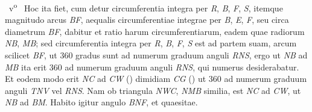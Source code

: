 %
~v\textsuperscript{o}\rbrack\ %
%
%
Hoc ita fiet,
cum detur circumferentia integra
per \textit{R}, \textit{B}, \textit{F}, \textit{S},
itemque magnitudo arcus \textit{BF},
aequalis circumferentiae integrae per \textit{B}, \textit{E}, \textit{F},
seu circa diametrum \textit{BF},
dabitur et ratio harum circumferentiarum,\protect{}
eadem quae radiorum \textit{NB}, \textit{MB};
sed circumferentia integra per \textit{R}, \textit{B}, \textit{F}, \textit{S}
est ad partem suam,
arcum\protect{} scilicet \textit{BF},
ut 360 gradus\protect{} sunt ad numerum graduum anguli \textit{RNS},
ergo ut \textit{NB} ad \textit{MB}
ita erit 360 ad numerum graduum anguli \textit{RNS},
qui numerus desiderabatur.\protect{}
Et eodem modo erit \textit{NC} ad \textit{CW}
(\phantom)\hspace*{-1.2mm}%
dimidiam \lbrack\textit{CG}\rbrack%
\phantom(\hspace*{-1.2mm})
ut 360 ad numerum graduum anguli\protect{} \textit{TNV} vel \textit{RNS}.
Nam ob triangula \textit{NWC}, \textit{NMB} similia,\protect{}
est \textit{NC} ad \textit{CW},
ut \textit{NB} ad \textit{BM}.%
%
Habito igitur angulo\protect{} \textit{BNF}, et
%
%
quaesitae.\protect{}
\pend
\count{}
\count{}
\count{}
%
%
%
%
%
%